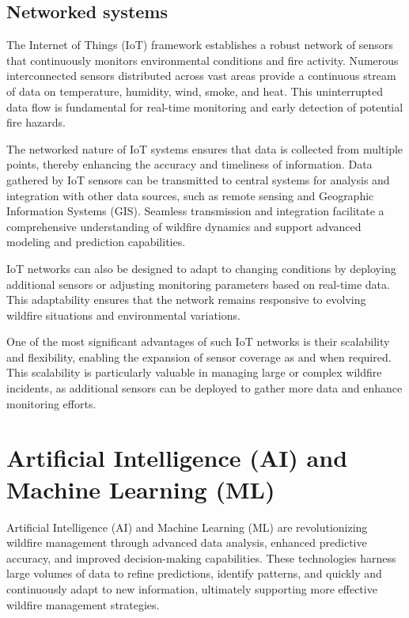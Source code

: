 \documentclass[
  12 pt,
]{Nemilov}
\begin{document}
\subsection{Networked systems}\label{networked-systems}

The Internet of Things (IoT) framework establishes a robust network of sensors that continuously monitors environmental conditions and fire activity. Numerous interconnected sensors distributed across vast areas provide a continuous stream of data on temperature, humidity, wind, smoke, and heat. This uninterrupted data flow is fundamental for real-time monitoring and early detection of potential fire hazards.

The networked nature of IoT systems ensures that data is collected from multiple points, thereby enhancing the accuracy and timeliness of information. Data gathered by IoT sensors can be transmitted to central systems for analysis and integration with other data sources, such as remote sensing and Geographic Information Systems (GIS). Seamless transmission and integration facilitate a comprehensive understanding of wildfire dynamics and support advanced modeling and prediction capabilities.

IoT networks can also be designed to adapt to changing conditions by deploying additional sensors or adjusting monitoring parameters based on real-time data. This adaptability ensures that the network remains responsive to evolving wildfire situations and environmental variations.

One of the most significant advantages of such IoT networks is their scalability and flexibility, enabling the expansion of sensor coverage as and when required. This scalability is particularly valuable in managing large or complex wildfire incidents, as additional sensors can be deployed to gather more data and enhance monitoring efforts.

\section{Artificial Intelligence (AI) and Machine Learning (ML)}\label{artificial-intelligence-ai-and-machine-learning-ml}

Artificial Intelligence (AI) and Machine Learning (ML) are revolutionizing wildfire management through advanced data analysis, enhanced predictive accuracy, and improved decision-making capabilities. These technologies harness large volumes of data to refine predictions, identify patterns, and quickly and continuously adapt to new information, ultimately supporting more effective wildfire management strategies.
\end{document}
